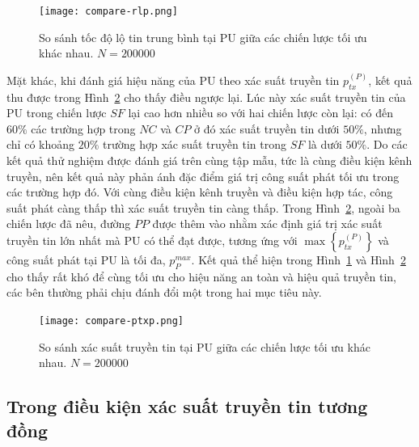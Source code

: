 \documentclass[../main.tex]{subfiles}
\begin{document}
\begin{figure}
\centering
\captionsetup{justification=centering}
\texttt{[image: compare-rlp.png]}
\caption{So sánh tốc độ lộ tin trung bình tại PU giữa các chiến lược tối ưu khác nhau. $N=200000$}
\label{fig:Compare:rlp}
\end{figure}

Mặt khác, khi đánh giá hiệu năng của PU theo xác suất truyền tin $p_{tx}^{(P)}$, kết quả thu được trong Hình~\ref{fig:Compare:ptxp} cho thấy điều ngược lại. Lúc này xác suất truyền tin của PU trong chiến lược $SF$ lại cao hơn nhiều so với hai chiến lược còn lại: có đến $60\%$ các trường hợp trong $NC$ và $CP$ ở đó xác suất truyền tin dưới $50\%$, nhưng chỉ có khoảng $20\%$ trường hợp xác suất truyền tin trong $SF$ là dưới $50\%$. Do các kết quả thử nghiệm được đánh giá trên cùng tập mẫu, tức là cùng điều kiện kênh truyền, nên kết quả này phản ánh đặc điểm giá trị công suất phát tối ưu trong các trường hợp đó. Với cùng điều kiện kênh truyền và điều kiện hợp tác, công suất phát càng thấp thì xác suất truyền tin càng thấp. Trong Hình~\ref{fig:Compare:ptxp}, ngoài ba chiến lược đã nêu, đường $PP$ được thêm vào nhằm xác định giá trị xác suất truyền tin lớn nhất mà PU có thể đạt được, tương ứng với $\max\left\{p_{tx}^{(P)}\right\}$ và công suất phát tại PU là tối đa, $p_P^{max}$. Kết quả thể hiện trong Hình~\ref{fig:Compare:rlp} và Hình~\ref{fig:Compare:ptxp} cho thấy rất khó để cùng tối ưu cho hiệu năng an toàn và hiệu quả truyền tin, các bên thường phải chịu đánh đổi một trong hai mục tiêu này. 

\begin{figure}
\centering
\captionsetup{justification=centering}
\texttt{[image: compare-ptxp.png]}
\caption{So sánh xác suất truyền tin tại PU giữa các chiến lược tối ưu khác nhau. $N=200000$}
\label{fig:Compare:ptxp}
\end{figure}

\subsection{Trong điều kiện xác suất truyền tin tương đồng}
\end{document}
